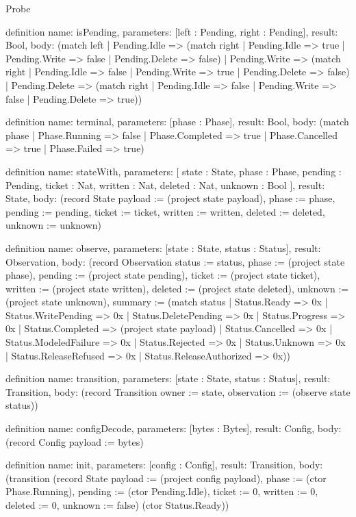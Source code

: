 \begin{lexlean}{Probe}
\begin{semanticmodule}
definition{
  name: isPending,
  parameters: [left : Pending, right : Pending],
  result: Bool,
  body: (match left
    | Pending.Idle => (match right
      | Pending.Idle => true
      | Pending.Write => false
      | Pending.Delete => false)
    | Pending.Write => (match right
      | Pending.Idle => false
      | Pending.Write => true
      | Pending.Delete => false)
    | Pending.Delete => (match right
      | Pending.Idle => false
      | Pending.Write => false
      | Pending.Delete => true))
}

definition{
  name: terminal,
  parameters: [phase : Phase],
  result: Bool,
  body: (match phase
    | Phase.Running => false
    | Phase.Completed => true
    | Phase.Cancelled => true
    | Phase.Failed => true)
}

definition{
  name: stateWith,
  parameters: [
    state : State,
    phase : Phase,
    pending : Pending,
    ticket : Nat,
    written : Nat,
    deleted : Nat,
    unknown : Bool
  ],
  result: State,
  body: (record State {payload := (project state payload), phase := phase, pending := pending, ticket := ticket, written := written, deleted := deleted, unknown := unknown})
}

definition{
  name: observe,
  parameters: [state : State, status : Status],
  result: Observation,
  body: (record Observation {status := status, phase := (project state phase), pending := (project state pending), ticket := (project state ticket), written := (project state written), deleted := (project state deleted), unknown := (project state unknown), summary := (match status
    | Status.Ready => 0x
    | Status.WritePending => 0x
    | Status.DeletePending => 0x
    | Status.Progress => 0x
    | Status.Completed => (project state payload)
    | Status.Cancelled => 0x
    | Status.ModeledFailure => 0x
    | Status.Rejected => 0x
    | Status.Unknown => 0x
    | Status.ReleaseRefused => 0x
    | Status.ReleaseAuthorized => 0x)})
}

definition{
  name: transition,
  parameters: [state : State, status : Status],
  result: Transition,
  body: (record Transition {owner := state, observation := (observe state status)})
}

definition{
  name: configDecode,
  parameters: [bytes : Bytes],
  result: Config,
  body: (record Config {payload := bytes})
}

definition{
  name: init,
  parameters: [config : Config],
  result: Transition,
  body: (transition (record State {payload := (project config payload), phase := (ctor Phase.Running), pending := (ctor Pending.Idle), ticket := 0, written := 0, deleted := 0, unknown := false}) (ctor Status.Ready))
}


\end{semanticmodule}
\end{lexlean}
